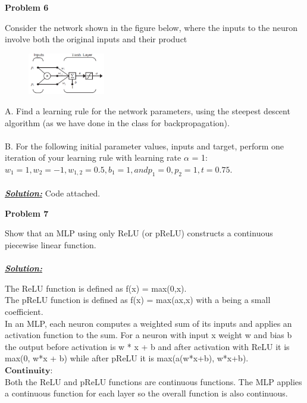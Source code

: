 \documentclass{article}
\begin{document}
\vspace{2cm}
\noindent \textbf{Problem 6}

\noindent Consider the network shown in the figure below, where the inputs to the neuron involve 
both the original inputs and their product \\
\begin{figure}[h]
  \centering
  \includegraphics[width=0.3\textwidth]{pr6.png}
\end{figure}
\newline
\noindent A. Find a learning rule for the network parameters, using the steepest descent algorithm 
(as we have done in the class for backpropagation).\\\\
B. For the following initial parameter values, inputs and target, perform one iteration of 
your learning rule with learning rate $\alpha$ = 1:$w_1= 1, w_2= -1, w_{1,2}= 0.5, b_1 = 1, and p_1= 0, p_2= 1, t= 0.75$. \\ \\


\noindent \underline{\textbf{\textit{Solution:}}}
\noindent Code attached.  



\newpage
\noindent \textbf{Problem 7}

\noindent Show that an MLP using only ReLU (or pReLU) constructs a continuous piecewise linear function. \\ \\

\noindent \underline{\textbf{\textit{Solution:}}}  

\noindent The ReLU function is defined as f(x) = max(0,x).\\
The pReLU function is defined as f(x) = max(ax,x) with a being a small coefficient.\\
In an MLP, each neuron computes a weighted sum of its inputs and applies an activation function to the sum. For a neuron 
with input x weight w and bias b the output before activation is w * x + b and after activation with ReLU it is max(0, w*x + b) while after pReLU it is max(a(w*x+b), w*x+b). \\

\noindent$\bm{Continuity:} $\\
Both the ReLU and pReLU functions are continuous functions. The MLP applies a continuous function for each layer so the overall function is also continuous.\\\\
\end{document}

